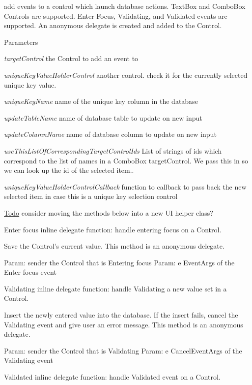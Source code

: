 add events to a control which launch database actions. TextBox and ComboBox Controls are supported. Enter Focus, Validating, and Validated events are supported. An anonymous delegate is created and added to the Control.


\begin{DoxyParams}{Parameters}
\item[{\em targetControl}]the Control to add an event to \item[{\em uniqueKeyValueHolderControl}]another control. check it for the currently selected unique key value. \item[{\em uniqueKeyName}]name of the unique key column in the database \item[{\em updateTableName}]name of database table to update on new input \item[{\em updateColumnName}]name of database column to update on new input \item[{\em useThisListOfCorrespondingTargetControlIds}]List of strings of ids which correspond to the list of names in a ComboBox targetControl. We pass this in so we can look up the id of the selected item.. \item[{\em uniqueKeyValueHolderControlCallback}]function to callback to pass back the new selected item in case this is a unique key selection control \end{DoxyParams}
\begin{Desc}
\item[\hyperlink{todo__todo000023}{Todo}]consider moving the methods below into a new UI helper class? \end{Desc}


Enter focus inline delegate function: handle entering focus on a Control.

Save the Control's current value. This method is an anonymous delegate.

Param: sender the Control that is Entering focus Param: e EventArgs of the Enter focus event

Validating inline delegate function: handle Validating a new value set in a Control.

Insert the newly entered value into the database. If the insert fails, cancel the Validating event and give user an error message. This method is an anonymous delegate.

Param: sender the Control that is Validating Param: e CancelEventArgs of the Validating event

Validated inline delegate function: handle Validated event on a Control.

